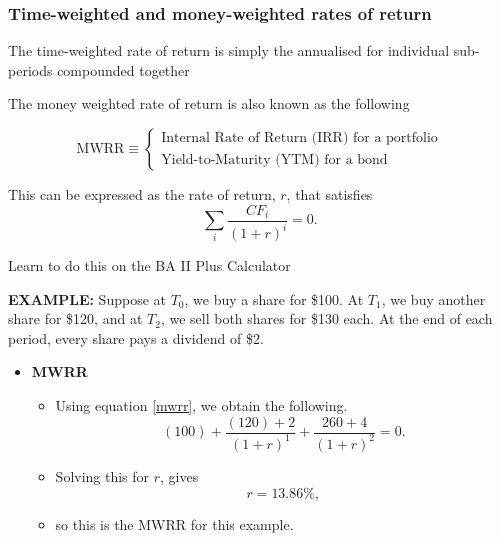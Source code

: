 \documentclass[../notes_compiled.tex]{subfiles}
\begin{document}
\subsubsection{Time-weighted and money-weighted rates of return}
\label{ssec-twrr-mwrrr}
\begin{itemize}
\item The time-weighted rate of return is simply the annualised for individual sub-periods compounded together

\item The money weighted rate of return is also known as the following

\begin{equation}
\text{MWRR} \equiv \begin{cases} \text{Internal Rate of Return (IRR) for a portfolio} \\ \text{Yield-to-Maturity (YTM) for a bond} \end{cases}
\end{equation}

\item This can be expressed as the rate of return, $r$, that satisfies
\begin{equation}
\sum_{i}\frac{CF_{i}}{(1+r)^{i}} = 0. \label{mwrr}
\end{equation}

\item[] Learn to do this on the BA II Plus Calculator

\textcolor{RedViolet}{
\item[] \textbf{EXAMPLE:} Suppose at $T_{0}$, we buy a share for \$100. At $T_{1}$, we buy another share for \$120, and at $T_{2}$, we sell both shares for \$130 each. At the end of each period, every share pays a dividend of \$2.
}
{\color{RoyalBlue}
\begin{itemize}
\item[] \textbf{MWRR}
\begin{itemize}
\item[] Using equation \ref{mwrr}, we obtain the following.
\begin{equation*}
 (100) + \frac{(120)+2}{(1+r)^{1}}+\frac{260+4}{(1+r)^{2}} = 0.
\end{equation*}
\item[] Solving this for $r$, gives
\begin{equation*}
r=13.86\%,
\end{equation*}
\item[] so this is the MWRR for this example.
\end{itemize}


\end{itemize}}
\end{itemize}
\end{document}
